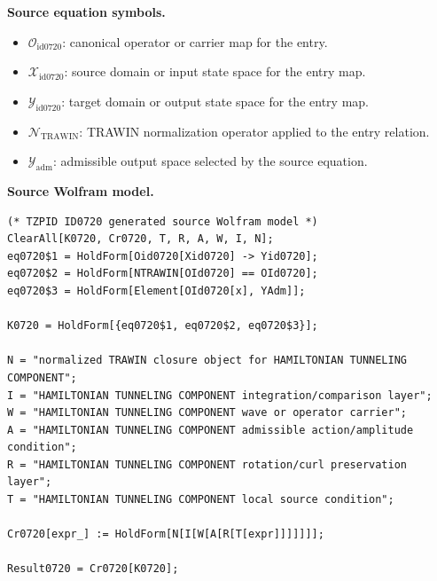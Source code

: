 \begin{minipage}[t]{0.49\linewidth}
\begingroup
\small
\raggedright
\textbf{Source equation symbols.}\par
\begin{itemize}[leftmargin=1.35em,itemsep=1pt,topsep=1pt,parsep=0pt]
    \item $\mathcal{O}_{\mathrm{id0720}}$: canonical operator or carrier map for the entry.
    \item $\mathcal{X}_{\mathrm{id0720}}$: source domain or input state space for the entry map.
    \item $\mathcal{Y}_{\mathrm{id0720}}$: target domain or output state space for the entry map.
    \item $\mathcal{N}_{\mathrm{TRAWIN}}$: TRAWIN normalization operator applied to the entry relation.
    \item $\mathcal{Y}_{\mathrm{adm}}$: admissible output space selected by the source equation.
\end{itemize}
\endgroup
\end{minipage}\hfill
\begin{minipage}[t]{0.47\linewidth}
\begingroup
\scriptsize
\raggedright
\textbf{Source Wolfram model.}\par
\begin{Verbatim}[fontsize=\tiny,breaklines=true,breakanywhere=true]
(* TZPID ID0720 generated source Wolfram model *)
ClearAll[K0720, Cr0720, T, R, A, W, I, N];
eq0720$1 = HoldForm[Oid0720[Xid0720] -> Yid0720];
eq0720$2 = HoldForm[NTRAWIN[OId0720] == OId0720];
eq0720$3 = HoldForm[Element[OId0720[x], YAdm]];

K0720 = HoldForm[{eq0720$1, eq0720$2, eq0720$3}];

N = "normalized TRAWIN closure object for HAMILTONIAN TUNNELING COMPONENT";
I = "HAMILTONIAN TUNNELING COMPONENT integration/comparison layer";
W = "HAMILTONIAN TUNNELING COMPONENT wave or operator carrier";
A = "HAMILTONIAN TUNNELING COMPONENT admissible action/amplitude condition";
R = "HAMILTONIAN TUNNELING COMPONENT rotation/curl preservation layer";
T = "HAMILTONIAN TUNNELING COMPONENT local source condition";

Cr0720[expr_] := HoldForm[N[I[W[A[R[T[expr]]]]]]];

Result0720 = Cr0720[K0720];
\end{Verbatim}
\endgroup
\end{minipage}

